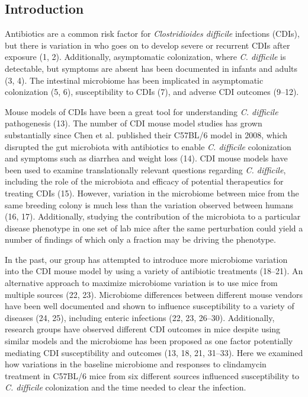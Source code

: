 \documentclass[11pt,]{article}
\begin{document}
\newpage

\subsection{Introduction}\label{introduction}

Antibiotics are a common risk factor for \emph{Clostridioides difficile}
infections (CDIs), but there is variation in who goes on to develop
severe or recurrent CDIs after exposure (1, 2). Additionally,
asymptomatic colonization, where \emph{C. difficile} is detectable, but
symptoms are absent has been documented in infants and adults (3, 4).
The intestinal microbiome has been implicated in asymptomatic
colonization (5, 6), susceptibility to CDIs (7), and adverse CDI
outcomes (9--12).

Mouse models of CDIs have been a great tool for understanding \emph{C.
difficile} pathogenesis (13). The number of CDI mouse model studies has
grown substantially since Chen et al. published their C57BL/6 model in
2008, which disrupted the gut microbiota with antibiotics to enable
\emph{C. difficile} colonization and symptoms such as diarrhea and
weight loss (14). CDI mouse models have been used to examine
translationally relevant questions regarding \emph{C. difficile},
including the role of the microbiota and efficacy of potential
therapeutics for treating CDIs (15). However, variation in the
microbiome between mice from the same breeding colony is much less than
the variation observed between humans (16, 17). Additionally, studying
the contribution of the microbiota to a particular disease phenotype in
one set of lab mice after the same perturbation could yield a number of
findings of which only a fraction may be driving the phenotype.

In the past, our group has attempted to introduce more microbiome
variation into the CDI mouse model by using a variety of antibiotic
treatments (18--21). An alternative approach to maximize microbiome
variation is to use mice from multiple sources (22, 23). Microbiome
differences between different mouse vendors have been well documented
and shown to influence susceptibility to a variety of diseases (24, 25),
including enteric infections (22, 23, 26--30). Additionally, research
groups have observed different CDI outcomes in mice despite using
similar models and the microbiome has been proposed as one factor
potentially mediating CDI susceptibility and outcomes (13, 18, 21,
31--33). Here we examined how variations in the baseline microbiome and
responses to clindamycin treatment in C57BL/6 mice from six different
sources influenced susceptibility to \emph{C. difficile} colonization
and the time needed to clear the infection.
\end{document}
